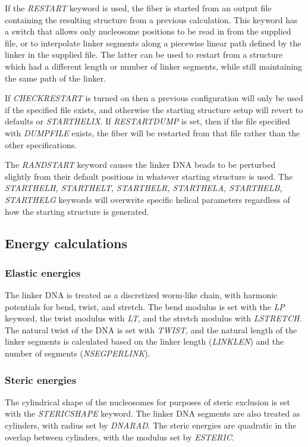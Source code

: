 \documentclass[12pt,dvips]{article}
\begin{document}
If the {\em RESTART} keyword is used, the fiber is started from an
output file containing the resulting structure from a previous
calculation. This keyword has a switch that allows only nucleosome positions to be read in from the supplied file, or to interpolate linker segments along a piecewise linear path defined by the linker in the supplied file. The latter can be used to restart from a structure which had a different length or number of linker segments, while still maintaining the same path of the linker.


If {\em CHECKRESTART} is turned on then a previous
configuration will only be used if the specified file exists, and
otherwise the starting structure setup will revert to defaults or {\em
  STARTHELIX}. If {\em RESTARTDUMP} is set, then if the file specified
with {\em DUMPFILE} exists, the fiber will be restarted from that
file rather than the other specifications.


The {\em RANDSTART} keyword causes the linker DNA beads to be
perturbed slightly from their default positions in whatever starting
structure is used. The {\em STARTHELH, STARTHELT, STARTHELR,
  STARTHELA, STARTHELB, STARTHELG} keywords will overwrite specific
helical parameters regardless of how the starting structure is generated.

\subsection{Energy calculations}
\label{sec:energy}
\subsubsection{Elastic energies}

The linker DNA is treated as a discretized worm-like chain, with
harmonic potentials for bend, twist, and stretch. The bend modulus is
set with the {\em LP} keyword, the twist modulus with {\em LT}, and
the stretch modulus with {\em LSTRETCH}. The natural twist of the DNA
is set with {\em TWIST}, and the natural length of the linker segments
is calculated based on the linker length ({\em LINKLEN}) and the
number of segments ({\em NSEGPERLINK}).

\subsubsection{Steric energies}

The cylindrical shape of the nucleosomes for purposes of steric
exclusion is set with the {\em STERICSHAPE} keyword. The linker DNA
segments are also treated as cylinders, with radius set by {\em
  DNARAD}. The steric energies are quadratic in the overlap between
cylinders, with the modulus set by {\em ESTERIC}. 
\end{document}
